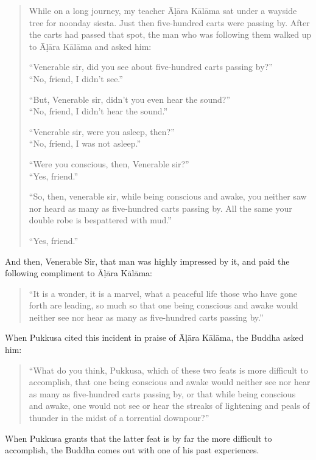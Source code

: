 \begin{quote}
While on a long journey, my teacher Āḷāra Kālāma sat under a wayside tree for noonday siesta. Just then five-hundred carts were passing by. After the carts had passed that spot, the man who was following them walked up to Āḷāra Kālāma and asked him:

``Venerable sir, did you see about five-hundred carts passing by?''\\
``No, friend, I didn't see.''

``But, Venerable sir, didn't you even hear the sound?''\\
``No, friend, I didn't hear the sound.''

``Venerable sir, were you asleep, then?''\\
``No, friend, I was not asleep.''

``Were you conscious, then, Venerable sir?''\\
``Yes, friend.''

``So, then, venerable sir, while being conscious and awake, you neither saw nor heard as many as five-hundred carts passing by. All the same your double robe is bespattered with mud.''

``Yes, friend.''
\end{quote}

And then, Venerable Sir, that man was highly impressed by it, and paid the following compliment to Āḷāra Kālāma:

\begin{quote}
``It is a wonder, it is a marvel, what a peaceful life those who have gone forth are leading, so much so that one being conscious and awake would neither see nor hear as many as five-hundred carts passing by.''
\end{quote}

When Pukkusa cited this incident in praise of Āḷāra Kālāma, the Buddha asked him:

\begin{quote}
``What do you think, Pukkusa, which of these two feats is more difficult to accomplish, that one being conscious and awake would neither see nor hear as many as five-hundred carts passing by, or that while being conscious and awake, one would not see or hear the streaks of lightening and peals of thunder in the midst of a torrential downpour?''
\end{quote}

When Pukkusa grants that the latter feat is by far the more difficult to accomplish, the Buddha comes out with one of his past experiences.

